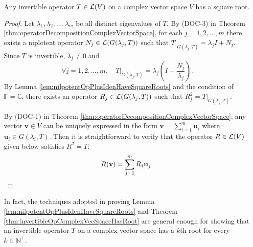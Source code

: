 \begin{thm}
  \label{thm:invertibleOpComplexVecSpaceHasRoot}
  Any invertible operator $T\in {\cal L}(V)$
  on a complex vector space $V$
  has a square root.
\end{thm}
\begin{proof}
  Let $\lambda_1, \lambda_2, \ldots, \lambda_m$
  be all distinct eigenvalues of $T$.
  By (DOC-3) in Theorem
  \ref{thm:operatorDecompositionComplexVectorSpace},
  for each $j=1,2,\ldots,m$ there exists a niplotent operator
  $N_j\in {\cal L}(G(\lambda_j,T))$ 
  such that
  $T|_{G(\lambda_j, T)}=\lambda_jI+N_j$.
  Since $T$ is invertible, $\lambda_j\ne 0$
  and
  \begin{displaymath}
    \forall j=1,2, \ldots, m,\quad
    T|_{G(\lambda_j, T)}=\lambda_j\left(I+\frac{N_j}{\lambda_j}\right).
  \end{displaymath}
  By Lemma \ref{lem:nilpotentOpPlusIdenHaveSquareRoots}
  and the condition of $\mathbb{F}=\mathbb{C}$,
  there exists an operator $R_j\in {\cal L}(G(\lambda_j,T))$
  such that $R_j^2=T|_{G(\lambda_j, T)}$.

  By (DOC-1) in Theorem
  \ref{thm:operatorDecompositionComplexVectorSpace},
  any vector $\mathbf{v}\in V$ can be uniquely expressed
  in the form $\mathbf{v}=\sum_{i=1}^m \mathbf{u}_i$
  where $\mathbf{u}_i\in G(\lambda_i,T)$.
  Then it is straightforward to verify that
  the operator $R\in{\cal L}(V)$ given below
  satisfies $R^2=T$:
  \begin{displaymath}
    R (\mathbf{v}) = \sum_{j=1}^m R_j \mathbf{u}_j. \qedhere
  \end{displaymath}
\end{proof}

\begin{rem}
  In fact, the techniques adopted in
  proving Lemma \ref{lem:nilpotentOpPlusIdenHaveSquareRoots}
  and Theorem \ref{thm:invertibleOpComplexVecSpaceHasRoot}
  are general enough for showing that
  an invertible operator $T$ on a complex vector space
  has a $k$th root for every $k\in \mathbb{N}^+$.
\end{rem}





